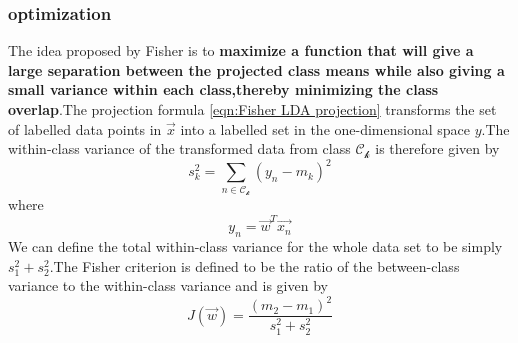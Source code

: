 \subsubsection{optimization}
The idea proposed by Fisher is to \textbf{maximize a function that will give a large separation between the projected class means while also giving a small variance within each class,thereby minimizing the class overlap}.The projection formula \ref{eqn:Fisher LDA projection} transforms the set of labelled data points in $\vec{x}$ into a labelled set in the one-dimensional space $y$.The within-class variance of the transformed data from class $\mathcal{C_k}$ is therefore given by
\begin{equation}
s_k^2 = \sum_{n\in \mathcal{C_k}}(y_n-m_k)^2 
\end{equation}
where\begin{equation}
y_n = \vec{w}^T\vec{x_n}
\end{equation}
We can define the total within-class variance for the whole data set to be simply $s_1^2+s_2^2$.The Fisher criterion is defined to be the ratio of the between-class variance to the within-class variance and is given by
\begin{equation}
J(\vec{w}) = \dfrac{(m_2-m_1)^2}{s_1^2+s_2^2}
\end{equation}


